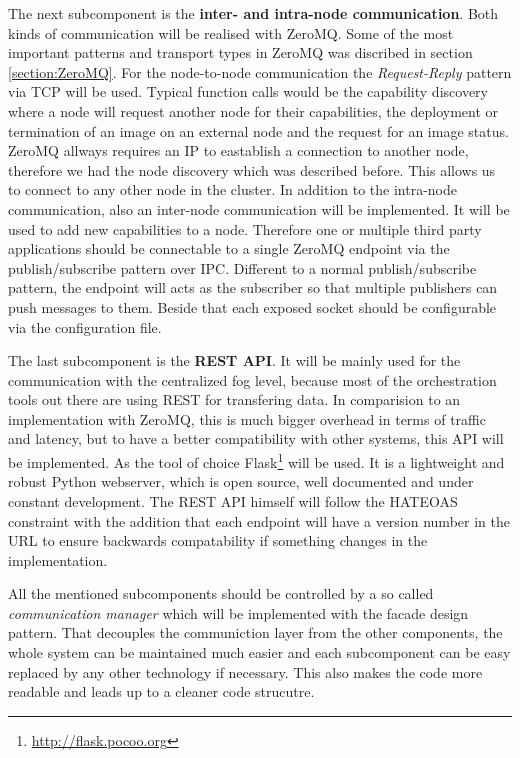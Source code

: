 The next subcomponent is the \textbf{inter- and intra-node communication}.
Both kinds of communication will be realised with ZeroMQ.
Some of the most important patterns and transport types in ZeroMQ was discribed in section \ref{section:ZeroMQ}.
For the node-to-node communication the \textit{Request-Reply} pattern via \ac{TCP} will be used.
Typical function calls would be the capability discovery where a node will request another node for their capabilities, the deployment or termination of an image on an external node and the request for an image status.
ZeroMQ allways requires an \ac{IP} to eastablish a connection to another node, therefore we had the node discovery which was described before.
This allows us to connect to any other node in the cluster.
In addition to the intra-node communication, also an inter-node communication will be implemented.
It will be used to add new capabilities to a node.
Therefore one or multiple third party applications should be connectable to a single ZeroMQ endpoint via the publish/subscribe pattern over \ac{IPC}.
Different to a normal publish/subscribe pattern, the endpoint will acts as the subscriber so that multiple publishers can push messages to them.
Beside that each exposed socket should be configurable via the configuration file.

The last subcomponent is the \textbf{\ac{REST} \ac{API}}.
It will be mainly used for the communication with the centralized fog level, because most of the orchestration tools out there are using \ac{REST} for transfering data.
In comparision to an implementation with ZeroMQ, this is much bigger overhead in terms of traffic and latency, but to have a better compatibility with other systems, this \ac{API} will be implemented.
As the tool of choice Flask\footnote{\url{http://flask.pocoo.org}} will be used.
It is a lightweight and robust Python webserver, which is open source, well documented and under constant development.
The \ac{REST} \ac{API} himself will follow the \ac{HATEOAS} constraint with the addition that each endpoint will have a version number in the \ac{URL} to ensure backwards compatability if something changes in the implementation.

All the mentioned subcomponents should be controlled by a so called \textit{communication manager} which will be implemented with the facade design pattern.
That decouples the communiction layer from the other components, the whole system can be maintained much easier and each subcomponent can be easy replaced by any other technology if necessary.
This also makes the code more readable and leads up to a cleaner code strucutre.


